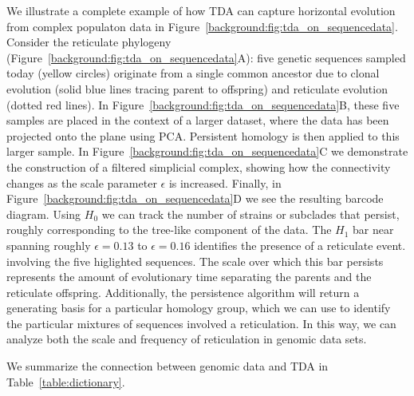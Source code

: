 We illustrate a complete example of how TDA can capture horizontal evolution from complex populaton data in Figure~\ref{background:fig:tda_on_sequencedata}.
Consider the reticulate phylogeny (Figure~\ref{background:fig:tda_on_sequencedata}A): five genetic sequences sampled today (yellow circles) originate from a single common ancestor due to clonal evolution (solid blue lines tracing parent to offspring) and reticulate evolution (dotted red lines).
In Figure~\ref{background:fig:tda_on_sequencedata}B, these five samples are placed in the context of a larger dataset, where the data has been projected onto the plane using PCA.
Persistent homology is then applied to this larger sample.
In Figure~\ref{background:fig:tda_on_sequencedata}C we demonstrate the construction of a filtered simplicial complex, showing how the connectivity changes as the scale parameter $\epsilon$ is increased.
Finally, in Figure~\ref{background:fig:tda_on_sequencedata}D we see the resulting barcode diagram.
Using $H_0$ we can track the number of strains or subclades that persist, roughly corresponding to the tree-like component of the data.
The $H_1$ bar near spanning roughly $\epsilon=0.13$ to $\epsilon=0.16$ identifies the presence of a reticulate event. involving the five higlighted sequences.
The scale over which this bar persists represents the amount of evolutionary time separating the parents and the reticulate offspring.
Additionally, the persistence algorithm will return a generating basis for a particular homology group, which we can use to identify the particular mixtures of sequences involved a reticulation.
In this way, we can analyze both the scale and frequency of reticulation in genomic data sets.

We summarize the connection between genomic data and TDA in Table~\ref{table:dictionary}.

